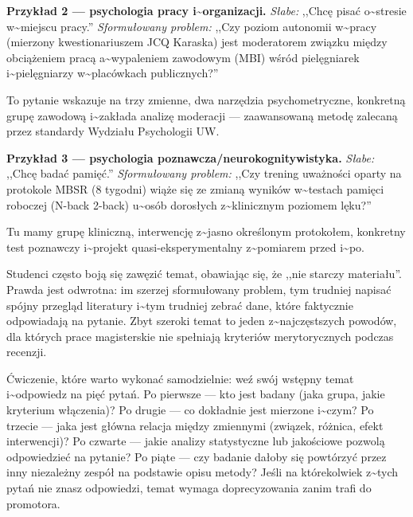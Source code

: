 \documentclass[12pt,a4paper,twoside,openany]{book}
\begin{document}
\textbf{Przykład 2 --- psychologia pracy i\textasciitilde{}organizacji.} \textit{Słabe:} ,,Chcę pisać o\textasciitilde{}stresie w\textasciitilde{}miejscu pracy.'' \textit{Sformułowany problem:} ,,Czy poziom autonomii w\textasciitilde{}pracy (mierzony kwestionariuszem JCQ Karaska) jest moderatorem związku między obciążeniem pracą a\textasciitilde{}wypaleniem zawodowym (MBI) wśród pielęgniarek i\textasciitilde{}pielęgniarzy w\textasciitilde{}placówkach publicznych?''


To pytanie wskazuje na trzy zmienne, dwa narzędzia psychometryczne, konkretną grupę zawodową i\textasciitilde{}zakłada analizę moderacji --- zaawansowaną metodę zalecaną przez standardy Wydziału Psychologii UW.


\textbf{Przykład 3 --- psychologia poznawcza/neurokognitywistyka.} \textit{Słabe:} ,,Chcę badać pamięć.'' \textit{Sformułowany problem:} ,,Czy trening uważności oparty na protokole MBSR (8 tygodni) wiąże się ze zmianą wyników w\textasciitilde{}testach pamięci roboczej (N-back 2-back) u\textasciitilde{}osób dorosłych z\textasciitilde{}klinicznym poziomem lęku?''


Tu mamy grupę kliniczną, interwencję z\textasciitilde{}jasno określonym protokołem, konkretny test poznawczy i\textasciitilde{}projekt quasi-eksperymentalny z\textasciitilde{}pomiarem przed i\textasciitilde{}po.


\begin{warningbox} Studenci często boją się zawęzić temat, obawiając się, że ,,nie starczy materiału''. Prawda jest odwrotna: im szerzej sformułowany problem, tym trudniej napisać spójny przegląd literatury i\textasciitilde{}tym trudniej zebrać dane, które faktycznie odpowiadają na pytanie. Zbyt szeroki temat to jeden z\textasciitilde{}najczęstszych powodów, dla których prace magisterskie nie spełniają kryteriów merytorycznych podczas recenzji.
\end{warningbox}


Ćwiczenie, które warto wykonać samodzielnie: weź swój wstępny temat i\textasciitilde{}odpowiedz na pięć pytań. Po pierwsze --- kto jest badany (jaka grupa, jakie kryterium włączenia)? Po drugie --- co dokładnie jest mierzone i\textasciitilde{}czym? Po trzecie --- jaka jest główna relacja między zmiennymi (związek, różnica, efekt interwencji)? Po czwarte --- jakie analizy statystyczne lub jakościowe pozwolą odpowiedzieć na pytanie? Po piąte --- czy badanie dałoby się powtórzyć przez inny niezależny zespół na podstawie opisu metody? Jeśli na którekolwiek z\textasciitilde{}tych pytań nie znasz odpowiedzi, temat wymaga doprecyzowania zanim trafi do promotora.
\end{document}
